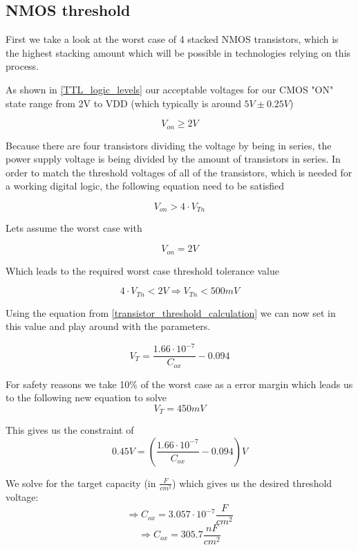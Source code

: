 \subsection{NMOS threshold}\label{nmos_gate_dimensioning}
First we take a look at the worst case of 4 stacked NMOS transistors, which is the highest stacking amount which will be possible in technologies relying on this process.


As shown in  \autoref{TTL_logic_levels} our acceptable voltages for our CMOS "ON" state range from 2V to VDD (which typically is around $5V\pm0.25V$)

\begin{equation}
V_{on} \geq 2V
\end{equation}

Because there are four transistors dividing the voltage by being in series, the power supply voltage is being divided by the amount of transistors in series.
In order to match the threshold voltages of all of the transistors, which is needed for a working digital logic, the following equation need to be satisfied

\begin{equation}
V_{on} > 4 \cdot V_{Tn}
\end{equation}

Lets assume the worst case with

\begin{equation}
V_{on} = 2V
\end{equation}

Which leads to the required worst case threshold tolerance value

\begin{equation}
4 \cdot V_{Tn} < 2V
\Rightarrow
V_{Tn} < 500mV
\end{equation}
 
 Using the equation from \autoref{transistor_threshold_calculation} we can now set in this value and play around with the parameters.
 
 \begin{equation}
V_T= \frac{1.66 \cdot 10^{-7}}{C_{ox}}-0.094
\end{equation}

For safety reasons we take 10\% of the worst case as a error margin which leads us to the following new equation to solve
 \begin{equation}
V_T = 450mV
\end{equation}

This gives us the constraint of
\begin{equation}
0.45 V = \left( \frac{1.66 \cdot 10^{-7}}{C_{ox}}-0.094 \right) V
\end{equation}

We solve for the target capacity (in $\frac{F}{cm^2}$) which gives us the desired threshold voltage:
\begin{equation}
\Rightarrow
C_{ox}
=
3.057 \cdot {10}^{-7} \frac{F}{cm^2}
\end{equation}
\begin{equation}
\Rightarrow
C_{ox}
=
305.7 \frac{nF}{cm^2}
\end{equation}